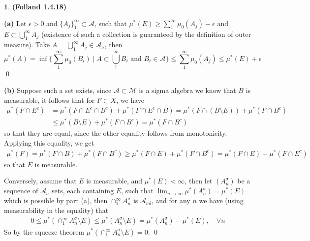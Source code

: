 \documentclass[10.5pt]{article}
\theoremstyle{definition}
\newtheorem{pb}{}
\newcommand{\set}[1]{\{#1\}}
\newcommand{\tand}{\text{ and }}
\begin{document}
    \begin{pb}\textbf{(Folland 1.4.18)}

        \textbf{(a)} Let \(\epsilon > 0\) and \(\set{A_j}_1^\infty \subset \mathcal{A}\), such that \(\mu^*(E) \geq \sum_1^\infty \mu_0(A_j) - \epsilon\) and \(E \subset \bigcup_1^\infty A_j\) (existence of such a collection is guaranteed by the definition of outer measure). Take \(A = \bigcup_1^\infty A_j \in \mathcal{A}_\sigma\), then \[\mu^*(A) = \inf\set{\sum_1^\infty \mu_0(B_i) \mid A \subset \bigcup_1^\infty B_i \tand B_i \in \mathcal{A}} \leq \sum_1^\infty \mu_0(A_j) \leq \mu^*(E) + \epsilon\] \qed

        \textbf{(b)} Suppose such a set exists, since \(\mathcal{A} \subset \mathcal{M}\) is a sigma algebra we know that \(B\) is measurable, it follows that for \(F \subset X\), we have 
        \begin{align*}
            \mu^*(F \cap E^c) &= \mu^*(F \cap E^c \cap B^c) + \mu^*(F \cap E^c \cap B) = \mu^*(F \cap (B \setminus E)) + \mu^*(F \cap B^c) \\ 
            &\leq \mu^*(B\setminus E) + \mu^*(F \cap B^c) = \mu^*(F \cap B^c)
        \end{align*}
        so that they are equal, since the other equality follows from monotonicity. Applying this equality, we get
        \begin{align*}
            \mu^*(F) = \mu^*(F \cap B) + \mu^*(F \cap B^c) \geq \mu^*(F \cap E) + \mu^*(F \cap B^c) = \mu^*(F \cap E) + \mu^*(F \cap E^c)
        \end{align*}
        so that \(E\) is measurable.

        Conversely, assume that \(E\) is measurable, and \(\mu^*(E) < \infty\), then let \((A^\sigma_n)\) be a sequence of \(\mathcal{A}_\sigma\) sets, each containing \(E\), such that \(\lim_{n\to\infty} \mu^*(A^\sigma_n) = \mu^*(E)\) which is possible by part (a), then \(\cap_1^\infty A^\sigma_n\) is \(\mathcal{A}_{\sigma \delta}\), and for any \(n\) we have (using measurability in the equality) that
        \begin{align*}
            0 \leq \mu^*(\cap_1^\infty A^\sigma_n \setminus E) \leq \mu^*(A_n^\sigma \setminus E) = \mu^*(A_n^\sigma) - \mu^*(E),\quad \forall n
        \end{align*}
        So by the squeeze theorem \(\mu^*(\cap_1^\infty A^\sigma_n \setminus E) = 0\).
        \qed


\end{pb}
\end{document}
